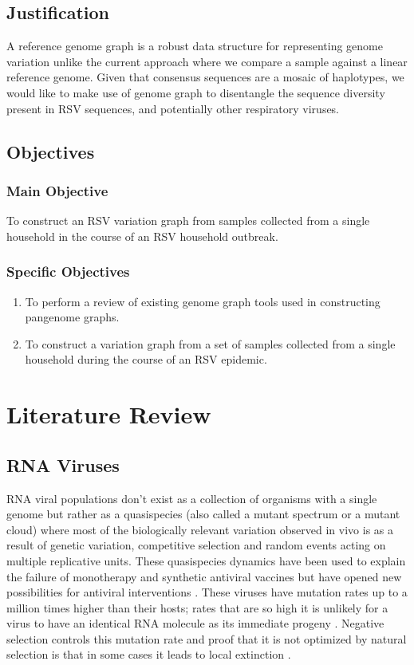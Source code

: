 \documentclass[10pt, a4paper]{article}
\begin{document}
\subsection{Justification}
\label{sec:org61d492f}
A reference genome graph is a robust data structure for representing genome
variation unlike the current approach where we compare a sample against a
linear reference genome. Given that consensus sequences are a mosaic of
haplotypes, we would like to make use of genome graph to disentangle the
sequence diversity present in RSV sequences, and potentially other respiratory
viruses. 
\subsection{Objectives}
\label{sec:orgd90fedb}
\subsubsection{Main Objective}
\label{sec:org3d50d87}
To construct an RSV variation graph from samples collected from a single
household in the course of an RSV household outbreak.
\subsubsection{Specific Objectives}
\label{sec:org4db530a}
\begin{enumerate}
\item To perform a review of existing genome graph tools used in constructing pangenome graphs.
\item To construct a variation graph from a set of samples collected from a single
household during the course of an RSV epidemic.
\end{enumerate}
\section{Literature Review}
\label{sec:orgec27178}
\subsection{RNA Viruses}
\label{sec:org4cdd9fb}
RNA viral populations don’t exist as a collection of organisms with a single
genome but rather as a quasispecies
(also called a mutant spectrum or a mutant cloud) where most of the biologically
relevant variation observed in vivo is as a result of genetic variation,
competitive selection and random events acting on multiple replicative units.
These quasispecies dynamics have been used to explain the failure of
monotherapy and synthetic antiviral vaccines but have opened new possibilities
for antiviral interventions \cite{domingoViralQuasispeciesEvolution2012}.
These viruses have mutation rates up to a million times higher than their hosts;
rates that are so high it is unlikely for a virus to have an identical RNA
molecule as its immediate progeny \cite{domingoViralQuasispeciesEvolution2012}. 
Negative selection controls this mutation rate and proof that it is not 
optimized by natural selection is that in some cases it leads to local
extinction \cite{duffyWhyAreRNA2018}.
\end{document}
